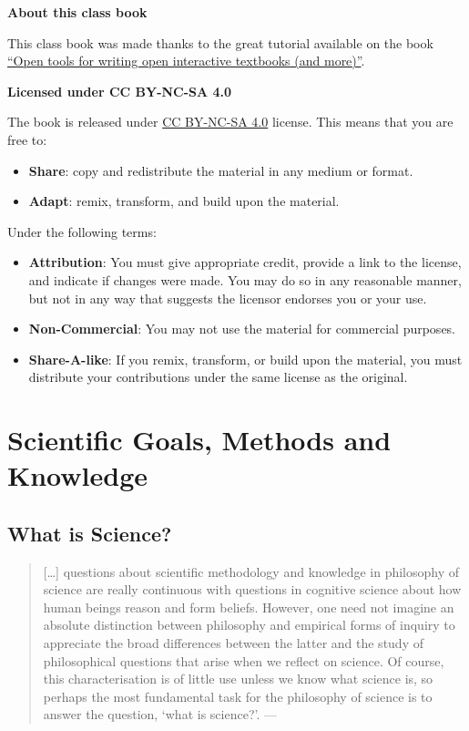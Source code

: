 \documentclass[
]{book}
\providecommand{\tightlist}{%
  \setlength{\itemsep}{0pt}\setlength{\parskip}{0pt}}
\begin{document}
\textbf{About this class book}

This class book was made thanks to the great tutorial available on the book \href{https://www.crumplab.com/OER_bookdown}{``Open tools for writing open interactive textbooks (and more)''}.

\textbf{Licensed under CC BY-NC-SA 4.0}

The book is released under \href{https://creativecommons.org/licenses/by-nc-sa/4.0/}{CC BY-NC-SA 4.0} license. This means that you are free to:

\begin{itemize}
\tightlist
\item
  \textbf{Share}: copy and redistribute the material in any medium or format.
\item
  \textbf{Adapt}: remix, transform, and build upon the material.
\end{itemize}

Under the following terms:

\begin{itemize}
\tightlist
\item
  \textbf{Attribution}: You must give appropriate credit, provide a link to the license, and indicate if changes were made. You may do so in any reasonable manner, but not in any way that suggests the licensor endorses you or your use.
\item
  \textbf{Non-Commercial}: You may not use the material for commercial purposes.
\item
  \textbf{Share-A-like}: If you remix, transform, or build upon the material, you must distribute your contributions under the same license as the original.
\end{itemize}

\hypertarget{scientific-goals-methods-and-knowledge}{%
\chapter{Scientific Goals, Methods and Knowledge}\label{scientific-goals-methods-and-knowledge}}

\hypertarget{what-is-science}{%
\section{What is Science?}\label{what-is-science}}

\begin{quote}
{[}\ldots{]} questions about scientific methodology and knowledge in philosophy of science are really continuous with questions in cognitive science about how human beings reason and form beliefs. However, one need not imagine an absolute distinction between philosophy and empirical forms of inquiry to appreciate the broad differences between the latter and the study of philosophical questions that arise when we reflect on science.
Of course, this characterisation is of little use unless we know what science is, so perhaps the most fundamental task for the philosophy of science is to answer the question, `what is science?'. --- \citep{ladyman2012understanding}
\end{quote}
\end{document}
